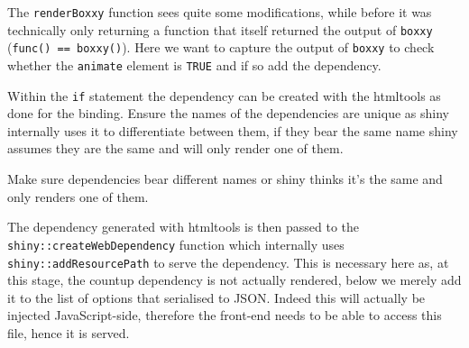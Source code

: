 \documentclass[
]{krantz}
\makeatletter
\newenvironment{Shaded}{\begin{snugshade}}{\end{snugshade}}
\newcommand{\CommentTok}[1]{\textcolor[rgb]{0.37,0.37,0.37}{\textit{#1}}}
\newcommand{\ControlFlowTok}[1]{\textcolor[rgb]{0.27,0.27,0.27}{\textbf{#1}}}
\newcommand{\DataTypeTok}[1]{\textcolor[rgb]{0.27,0.27,0.27}{#1}}
\newcommand{\KeywordTok}[1]{\textcolor[rgb]{0.27,0.27,0.27}{\textbf{#1}}}
\newcommand{\NormalTok}[1]{#1}
\newcommand{\OperatorTok}[1]{\textcolor[rgb]{0.43,0.43,0.43}{\textbf{#1}}}
\newcommand{\OtherTok}[1]{\textcolor[rgb]{0.37,0.37,0.37}{#1}}
\newcommand{\StringTok}[1]{\textcolor[rgb]{0.5,0.5,0.5}{#1}}
\newenvironment{kframe}{%
\medskip{}
\setlength{\fboxsep}{.8em}
 \def\at@end@of@kframe{}%
 \ifinner\ifhmode%
  \def\at@end@of@kframe{\end{minipage}}%
  \begin{minipage}{\columnwidth}%
 \fi\fi%
 \def\FrameCommand##1{\hskip\@totalleftmargin \hskip-\fboxsep
 \colorbox{shadecolor}{##1}\hskip-\fboxsep
     \hskip-\linewidth \hskip-\@totalleftmargin \hskip\columnwidth}%
 \MakeFramed {\advance\hsize-\width
   \@totalleftmargin\z@ \linewidth\hsize
   \@setminipage}}%
 {\par\unskip\endMakeFramed%
 \at@end@of@kframe}
\renewenvironment{Shaded}{\begin{kframe}}{\end{kframe}}
\newenvironment{rmdblock}[1]
  {
  \begin{itemize}
  \renewcommand{\labelitemi}{
    \raisebox{-.7\height}[0pt][0pt]{
      {\setkeys{Gin}{width=3em,keepaspectratio}\texttt{[image: images/\#1]}}
    }
  }
  \setlength{\fboxsep}{1em}
  \begin{kframe}
  \item
  }
  {
  \end{kframe}
  \end{itemize}
  }
\newenvironment{rmdnote}
  {\begin{rmdblock}{note}}
  {\end{rmdblock}}
\makeatother
\begin{document}
The \texttt{renderBoxxy} function sees quite some modifications, while before it was technically only returning a function that itself returned the output of \texttt{boxxy} (\texttt{func()\ ==\ boxxy()}). Here we want to capture the output of \texttt{boxxy} to check whether the \texttt{animate} element is \texttt{TRUE} and if so add the dependency.

\begin{Shaded}
\end{Shaded}

Within the \texttt{if} statement the dependency can be created with the htmltools as done for the binding. Ensure the names of the dependencies are unique as shiny internally uses it to differentiate between them, if they bear the same name shiny assumes they are the same and will only render one of them.

\begin{rmdnote}
Make sure dependencies bear different names or shiny thinks it's the
same and only renders one of them.
\end{rmdnote}

The dependency generated with htmltools is then passed to the \texttt{shiny::createWebDependency} function which internally uses \texttt{shiny::addResourcePath} to serve the dependency. This is necessary here as, at this stage, the countup dependency is not actually rendered, below we merely add it to the list of options that serialised to JSON. Indeed this will actually be injected JavaScript-side, therefore the front-end needs to be able to access this file, hence it is served.
\end{document}
